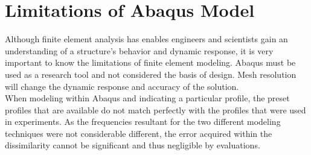 \section{Limitations of Abaqus Model}
\indent Although finite element analysis has enables engineers and scientists gain an understanding of a structure’s behavior and dynamic response, it is very important to know the limitations of finite element modeling. Abaqus must be used as a research tool and not considered the basis of design. Mesh resolution will change the dynamic response and accuracy of the solution. \\
\indent When modeling within Abaqus and indicating a particular profile, the preset profiles that are available do not match perfectly with the profiles that were used in experiments. As the frequencies resultant for the two different modeling techniques were not considerable different, the error acquired within the dissimilarity cannot be significant and thus negligible by evaluations. \\
